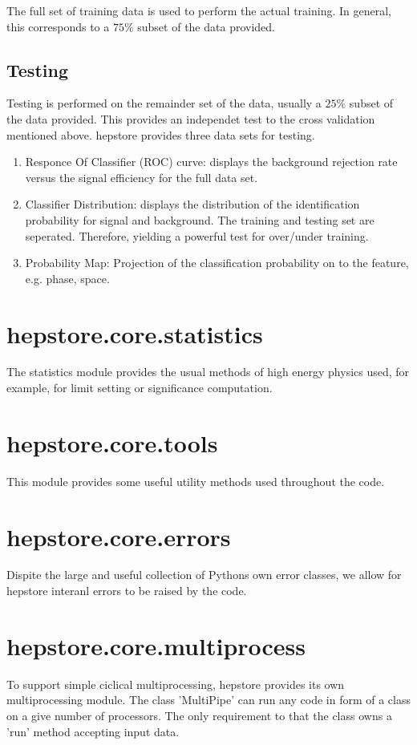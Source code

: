 The full set of training data is used to perform the actual
training. In general, this corresponds to a $75\%$ subset of the data
provided.

\subsection{Testing}

Testing is performed on the remainder set of the data, usually a
$25\%$ subset of the data provided. This provides an independet test
to the cross validation mentioned above. hepstore provides three data
sets for testing.
%
\begin{enumerate}
\item Responce Of Classifier (ROC) curve: displays the background
  rejection rate versus the signal efficiency for the full data set.
\item Classifier Distribution: displays the distribution of the
  identification probability for signal and background. The training
  and testing set are seperated. Therefore, yielding a powerful test
  for over/under training.
\item Probability Map: Projection of the classification probability on
  to the feature, e.g. phase, space.
\end{enumerate}
%

\section{hepstore.core.statistics}

The statistics module provides the usual methods of high energy
physics used, for example, for limit setting or significance
computation.

\section{hepstore.core.tools}

This module provides some useful utility methods used throughout the
code.
%
\hspace*{0.5cm}
\hspace*{0.5cm}
%

\section{hepstore.core.errors}

Dispite the large and useful collection of Pythons own error classes,
we allow for hepstore interanl errors to be raised by the code.
%
\hspace*{0.5cm}
\hspace*{0.5cm}
%

\section{hepstore.core.multiprocess}

To support simple ciclical multiprocessing, hepstore provides its own
multiprocessing module. The class 'MultiPipe' can run any code in form
of a class on a give number of processors. The only requirement to
that the class owns a 'run' method accepting input data.
